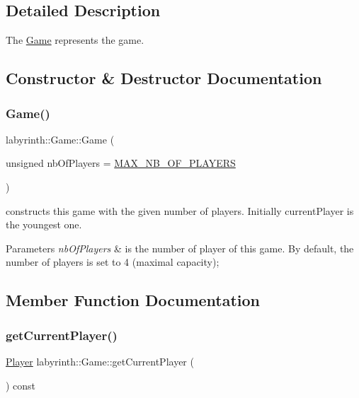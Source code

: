 \subsection{Detailed Description}
The \mbox{\hyperlink{classlabyrinth_1_1_game}{Game}} represents the game. 

\subsection{Constructor \& Destructor Documentation}
\mbox{\label{classlabyrinth_1_1_game_acc1b27a7dbaba790dba67bcfd4783479}} 
\subsubsection{\texorpdfstring{Game()}{Game()}}
{\footnotesize\ttfamily labyrinth\+::\+Game\+::\+Game (\begin{DoxyParamCaption}\item[{unsigned}]{nb\+Of\+Players = {\ttfamily \mbox{\hyperlink{classlabyrinth_1_1_game_ab9f172b0ca2a0332163b7dbdbb45775a}{M\+A\+X\+\_\+\+N\+B\+\_\+\+O\+F\+\_\+\+P\+L\+A\+Y\+E\+RS}}} }\end{DoxyParamCaption})}



constructs this game with the given number of players. Initially current\+Player is the youngest one. 


\begin{DoxyParams}{Parameters}
{\em nb\+Of\+Players} & is the number of player of this game. By default, the number of players is set to 4 (maximal capacity); \\
\hline
\end{DoxyParams}


\subsection{Member Function Documentation}
\mbox{\label{classlabyrinth_1_1_game_a9d7dacde88c7cfde1e1414eb35e4e2a6}} 
\subsubsection{\texorpdfstring{getCurrentPlayer()}{getCurrentPlayer()}}
{\footnotesize\ttfamily \mbox{\hyperlink{structlabyrinth_1_1_player}{Player}} labyrinth\+::\+Game\+::get\+Current\+Player (\begin{DoxyParamCaption}{ }\end{DoxyParamCaption}) const\hspace{0.3cm}{\ttfamily [inline]}}



